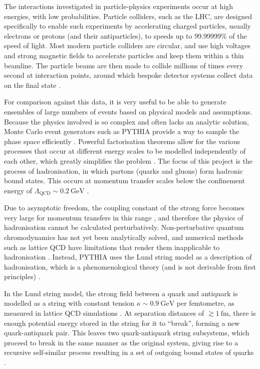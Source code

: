 \documentclass[12pt,a4paper]{report}
\begin{document}
The interactions investigated in particle-physics experiments occur at high energies, with low probabilities. Particle colliders, such as the LHC, are designed specifically to enable such experiments by accelerating charged particles, usually electrons or protons (and their antiparticles), to speeds up to 99.99999\% of the speed of light. Most modern particle colliders are circular, and use high voltages and strong magnetic fields to accelerate particles and keep them within a thin beamline. The particle beams are then made to collide millions of times every second at interaction points, around which bespoke detector systems collect data on the final state \cite{navas_review_2024, evans_lhc_2008, ellis_qcd_1996}.

For comparison against this data, it is very useful to be able to generate ensembles of large numbers of events based on physical models and assumptions. Because the physics involved is so complex and often lacks an analytic solution, Monte Carlo event generators such as PYTHIA provide a way to sample the phase space efficiently \cite{navas_review_2024, Bierlich:2022pfr, Buckley:2011ms, Skands:2012ts}. Powerful factorisation theorems allow for the various processes that occur at different energy scales to be modelled independently of each other, which greatly simplifies the problem \cite{Collins:1981uw, Skands:2012ts}. The focus of this project is the process of hadronisation, in which partons (quarks and gluons) form hadronic bound states. This occurs at momentum transfer scales below the confinement energy of $\Lambda_\text{QCD} \sim \qty{0.2}{\giga\electronvolt}$ \cite{Skands:2012ts}.

Due to asymptotic freedom, the coupling constant of the strong force becomes very large for momentum transfers in this range \cite{Gross:1973ju}, and therefore the physics of hadronisation cannot be calculated perturbatively. Non-perturbative quantum chromodynamics has not yet been analytically solved, and numerical methods such as lattice QCD have limitations that render them inapplicable to hadronisation \cite{Salam:2010zt}. Instead, PYTHIA uses the Lund string model as a description of hadronisation, which is a phenomenological theory (and is not derivable from first principles) \cite{Bierlich:2022pfr,Andersson:1983ia}.

In the Lund string model, the strong field between a quark and antiquark is modelled as a string with constant tension $\kappa \sim \qty{0.9}{\giga\electronvolt}$ per femtometre, as measured in lattice QCD simulations \cite{Bali:1992ab,Skands:2012ts}. At separation distances of $\gtrsim \qty{1}{\femto\meter}$, there is enough potential energy stored in the string for it to ``break'', forming a new quark-antiquark pair. This leaves two quark-antiquark string subsystems, which proceed to break in the same manner as the original system, giving rise to a recursive self-similar process resulting in a set of outgoing bound states of quarks \cite{Andersson:1983ia,Andersson:1997xwk,Bierlich:2022pfr,Skands:2012ts}.
\end{document}

